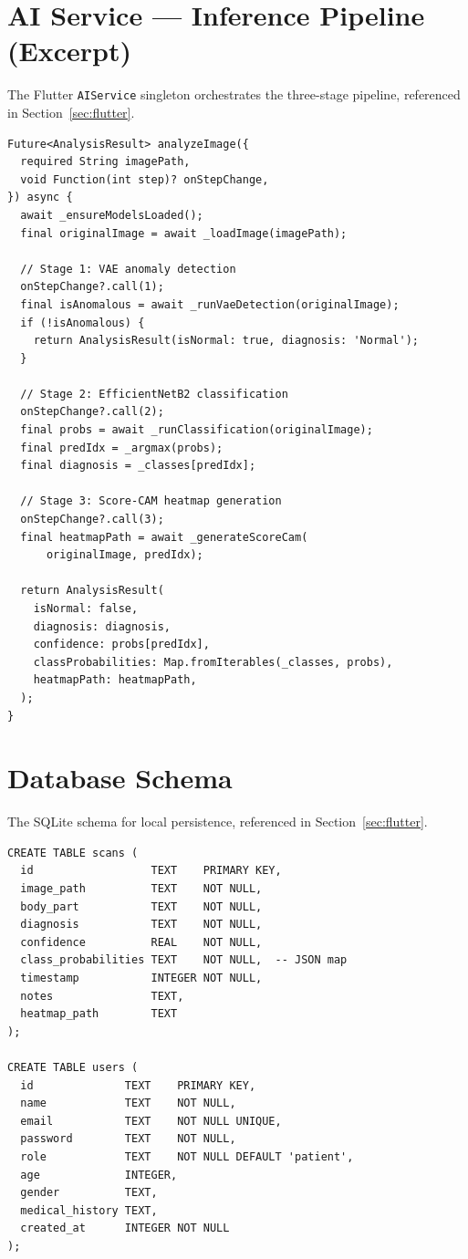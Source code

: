 \section{AI Service --- Inference Pipeline (Excerpt)}
\label{app:ai_service}

The Flutter \texttt{AIService} singleton orchestrates the three-stage pipeline, referenced in Section~\ref{sec:flutter}.

\begin{verbatim}
Future<AnalysisResult> analyzeImage({
  required String imagePath,
  void Function(int step)? onStepChange,
}) async {
  await _ensureModelsLoaded();
  final originalImage = await _loadImage(imagePath);

  // Stage 1: VAE anomaly detection
  onStepChange?.call(1);
  final isAnomalous = await _runVaeDetection(originalImage);
  if (!isAnomalous) {
    return AnalysisResult(isNormal: true, diagnosis: 'Normal');
  }

  // Stage 2: EfficientNetB2 classification
  onStepChange?.call(2);
  final probs = await _runClassification(originalImage);
  final predIdx = _argmax(probs);
  final diagnosis = _classes[predIdx];

  // Stage 3: Score-CAM heatmap generation
  onStepChange?.call(3);
  final heatmapPath = await _generateScoreCam(
      originalImage, predIdx);

  return AnalysisResult(
    isNormal: false,
    diagnosis: diagnosis,
    confidence: probs[predIdx],
    classProbabilities: Map.fromIterables(_classes, probs),
    heatmapPath: heatmapPath,
  );
}
\end{verbatim}

\section{Database Schema}
\label{app:db_schema}

The SQLite schema for local persistence, referenced in Section~\ref{sec:flutter}.

\begin{verbatim}
CREATE TABLE scans (
  id                  TEXT    PRIMARY KEY,
  image_path          TEXT    NOT NULL,
  body_part           TEXT    NOT NULL,
  diagnosis           TEXT    NOT NULL,
  confidence          REAL    NOT NULL,
  class_probabilities TEXT    NOT NULL,  -- JSON map
  timestamp           INTEGER NOT NULL,
  notes               TEXT,
  heatmap_path        TEXT
);

CREATE TABLE users (
  id              TEXT    PRIMARY KEY,
  name            TEXT    NOT NULL,
  email           TEXT    NOT NULL UNIQUE,
  password        TEXT    NOT NULL,
  role            TEXT    NOT NULL DEFAULT 'patient',
  age             INTEGER,
  gender          TEXT,
  medical_history TEXT,
  created_at      INTEGER NOT NULL
);
\end{verbatim}

